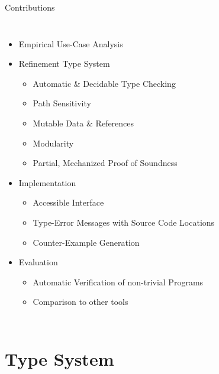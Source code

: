 \documentclass{sdqbeamer}
\begin{document}
\begin{frame}{Contributions}
  \begin{columns}
    \begin{itemize}
      \item Empirical Use-Case Analysis
      \item Refinement Type System
      \begin{itemize}
        \item Automatic \& Decidable Type Checking
        \item Path Sensitivity
        \item Mutable Data \& References
        \item Modularity
        \item Partial, Mechanized Proof of Soundness
      \end{itemize}
      \item Implementation
      \begin{itemize}
        \item Accessible Interface
        \item Type-Error Messages with Source Code Locations
        \item Counter-Example Generation
      \end{itemize}
      \item Evaluation
      \begin{itemize}
        \item Automatic Verification of non-trivial Programs
        \item Comparison to other tools
      \end{itemize}
    \end{itemize}

  \end{columns}
\end{frame}


\section{Type System}
\end{document}
